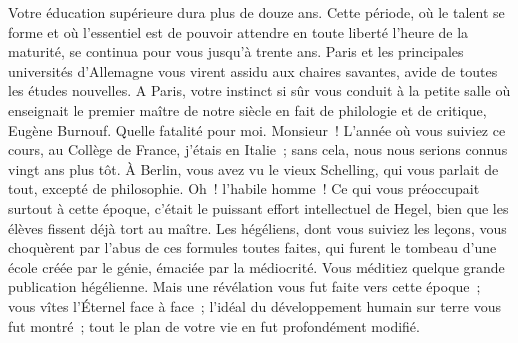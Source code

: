 \documentclass[french,twoside]{book} %
\newcommand\orgName[1]{#1}
\newcommand\persName[1]{#1}
\newcommand\placeName[1]{#1}
\begin{document}
Votre éducation supérieure dura plus de douze ans. Cette période, où le talent se forme et où l’essentiel est de pouvoir attendre en toute liberté l’heure de la maturité, se continua pour vous jusqu’à trente ans. {\placeName Paris} et les principales universités d’{\placeName Allemagne} vous virent assidu aux chaires savantes, avide de toutes les études nouvelles. A {\placeName Paris}, votre instinct si sûr vous conduit à la petite salle où enseignait le premier maître de notre siècle en fait de philologie et de critique, {\persName Eugène Burnouf}. Quelle fatalité pour moi. Monsieur ! L’année où vous suiviez ce cours, au {\orgName Collège de France}, j’étais en {\placeName Italie} ; sans cela, nous nous serions connus vingt ans plus tôt. À {\placeName Berlin}, vous avez vu le vieux {\persName Schelling}, qui vous parlait de tout, excepté de philosophie. Oh ! l’habile homme ! Ce qui vous préoccupait surtout à cette époque, c’était le puissant effort intellectuel de Hegel, bien que les élèves fissent déjà tort au maître. Les hégéliens, dont vous suiviez les leçons, vous choquèrent par l’abus de ces formules toutes faites, qui furent le tombeau d’une école créée par le génie, émaciée par la médiocrité. Vous méditiez quelque grande publication hégélienne. Mais une révélation vous fut faite vers cette époque ; vous vîtes l’{\persName Éternel} face à face ; l’idéal du développement humain sur terre vous fut montré ; tout le plan de votre vie en fut profondément modifié.\par
\end{document}
